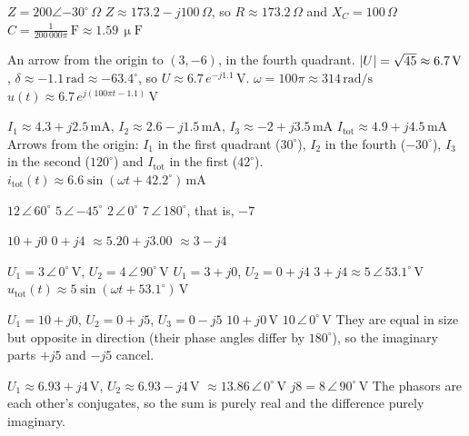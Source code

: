 
\begin{facit}

  $Z = 200\angle{-30^{\circ}}\,\Omega$
 $Z \approx 173.2 - j100\,\Omega$, so $R \approx 173.2\,\Omega$ and $X_C = 100\,\Omega$
 $C = \frac{1}{200\,000\pi}\,\text{F} \approx 1.59\,\upmu\text{F}$

  An arrow from the origin to $(3, -6)$, in the fourth quadrant.
 $\lvert U\rvert = \sqrt{45} \approx 6.7\,\text{V}$, $\delta \approx -1.1\,\text{rad} \approx
-63.4^{\circ}$, so $U \approx 6.7\,e^{-j1.1}\,\text{V}$.
 $\omega = 100\pi \approx 314\,\text{rad/s}$
 $u(t) \approx 6.7\,e^{j(100\pi t - 1.1)}\,\text{V}$

  $I_1 \approx 4.3 + j2.5\,\text{mA}$, $I_2 \approx 2.6 - j1.5\,\text{mA}$,
$I_3 \approx -2 + j3.5\,\text{mA}$
 $I_{\text{tot}} \approx 4.9 + j4.5\,\text{mA}$
 Arrows from the origin: $I_1$ in the first quadrant ($30^{\circ}$), $I_2$ in the fourth
($-30^{\circ}$), $I_3$ in the second ($120^{\circ}$) and $I_{\text{tot}}$ in the first
($42^{\circ}$).
 $i_{\text{tot}}(t) \approx 6.6\sin(\omega t + 42.2^{\circ})\,\text{mA}$

  $12\,\angle\,60^{\circ}$  $5\,\angle\,{-45^{\circ}}$
 $2\,\angle\,0^{\circ}$  $7\,\angle\,180^{\circ}$, that is, $-7$

  $10 + j0$  $0 + j4$  $\approx 5.20 + j3.00$
 $\approx 3 - j4$

  $U_1 = 3\,\angle\,0^{\circ}\,\text{V}$, $U_2 = 4\,\angle\,90^{\circ}\,\text{V}$
 $U_1 = 3 + j0$, $U_2 = 0 + j4$
 $3 + j4 \approx 5\,\angle\,53.1^{\circ}\,\text{V}$
 $u_{\text{tot}}(t) \approx 5\sin(\omega t + 53.1^{\circ})\,\text{V}$

  $U_1 = 10 + j0$, $U_2 = 0 + j5$, $U_3 = 0 - j5$  $10 + j0\,\text{V}$
 $10\,\angle\,0^{\circ}\,\text{V}$
 They are equal in size but opposite in direction (their phase angles differ by
$180^{\circ}$), so the imaginary parts $+j5$ and $-j5$ cancel.

  $U_1 \approx 6.93 + j4\,\text{V}$, $U_2 \approx 6.93 - j4\,\text{V}$
 $\approx 13.86\,\angle\,0^{\circ}\,\text{V}$  $j8 = 8\,\angle\,90^{\circ}\,\text{V}$
 The phasors are each other's conjugates, so the sum is purely real and the difference
purely imaginary.


\end{facit}

